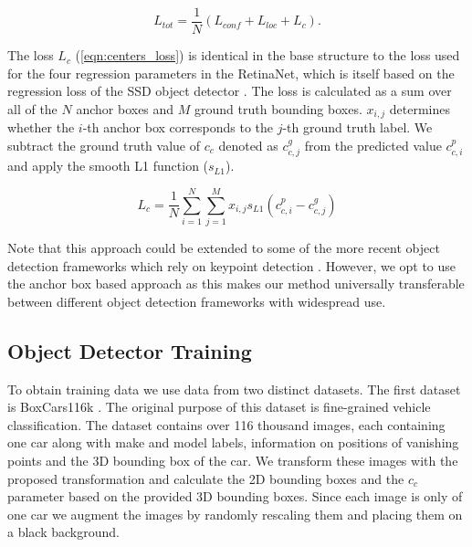 \documentclass[twocolumn]{svjour3}          \smartqed  \usepackage{graphicx}
\begin{document}
\begin{equation}
\label{eqn:all_losses}
L_{tot} = \frac{1}{N}\left(L_{conf} + L_{loc} + L_{c}\right).
\end{equation}

The loss $L_{c}$ (\ref{eqn:centers_loss}) is identical in the base structure to the loss used for the four regression parameters in the RetinaNet, which is itself based on the regression loss of the SSD object detector \cite{SSD}. The loss is calculated as a sum over all of the $N$ anchor boxes and $M$ ground truth bounding boxes. $x_{i,j}$ determines whether the $i$-th anchor box corresponds to the $j$-th ground truth label. We subtract the ground truth value of $c_c$ denoted as $c_{c,j}^g$ from the predicted value $c_{c,i}^p$ and apply the smooth L1 function ($s_{L1}$).

\begin{equation}
\label{eqn:centers_loss}
L_{c} = \frac{1}{N} \sum_{i=1}^N \sum_{j=1}^M x_{i,j} s_{L1} \left( c_{c,i}^p - c_{c,j}^g \right)
\end{equation}

Note that this approach could be extended to some of the more recent object detection frameworks which rely on keypoint detection \cite{CornerNet,ObjectsAsPoints}. However, we opt to use the anchor box based approach as this makes our method universally transferable between different object detection frameworks with widespread use. 

\subsection{Object Detector Training}

To obtain training data we use data from two distinct datasets. The first dataset is BoxCars116k \cite{boxcars}. The original purpose of this dataset is fine-grained vehicle classification. The dataset contains over 116 thousand images, each containing one car along with make and model labels, information on positions of vanishing points and the 3D bounding box of the car. We transform these images with the proposed transformation and calculate the 2D bounding boxes and the $c_c$ parameter based on the provided 3D bounding boxes. Since each image is only of one car we augment the images by randomly rescaling them and placing them on a black background.

\label{sec:BCS}
\end{document}
